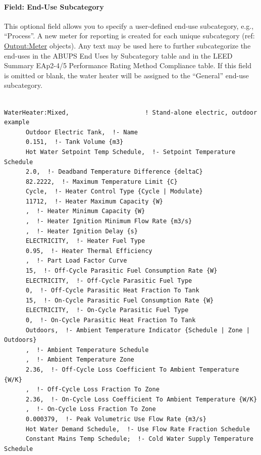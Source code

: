 \paragraph{Field: End-Use Subcategory}

This optional field allows you to specify a user-defined end-use subcategory, e.g., ``Process''. A new meter for reporting is created for each unique subcategory (ref: \hyperref[outputmeter-and-outputmetermeterfileonly]{Output:Meter} objects). Any text may be used here to further subcategorize the end-uses in the ABUPS End Uses by Subcategory table and in the LEED Summary EAp2-4/5 Performance Rating Method Compliance table. If this field is omitted or blank, the water heater will be assigned to the ``General'' end-use subcategory.


\begin{lstlisting}

WaterHeater:Mixed,                     ! Stand-alone electric, outdoor example
      Outdoor Electric Tank,  !- Name
      0.151,  !- Tank Volume {m3}
      Hot Water Setpoint Temp Schedule,  !- Setpoint Temperature Schedule
      2.0,  !- Deadband Temperature Difference {deltaC}
      82.2222,  !- Maximum Temperature Limit {C}
      Cycle,  !- Heater Control Type {Cycle | Modulate}
      11712,  !- Heater Maximum Capacity {W}
      ,  !- Heater Minimum Capacity {W}
      ,  !- Heater Ignition Minimum Flow Rate {m3/s}
      ,  !- Heater Ignition Delay {s}
      ELECTRICITY,  !- Heater Fuel Type
      0.95,  !- Heater Thermal Efficiency
      ,  !- Part Load Factor Curve
      15,  !- Off-Cycle Parasitic Fuel Consumption Rate {W}
      ELECTRICITY,  !- Off-Cycle Parasitic Fuel Type
      0,  !- Off-Cycle Parasitic Heat Fraction To Tank
      15,  !- On-Cycle Parasitic Fuel Consumption Rate {W}
      ELECTRICITY,  !- On-Cycle Parasitic Fuel Type
      0,  !- On-Cycle Parasitic Heat Fraction To Tank
      Outdoors,  !- Ambient Temperature Indicator {Schedule | Zone | Outdoors}
      ,  !- Ambient Temperature Schedule
      ,  !- Ambient Temperature Zone
      2.36,  !- Off-Cycle Loss Coefficient To Ambient Temperature {W/K}
      ,  !- Off-Cycle Loss Fraction To Zone
      2.36,  !- On-Cycle Loss Coefficient To Ambient Temperature {W/K}
      ,  !- On-Cycle Loss Fraction To Zone
      0.000379,  !- Peak Volumetric Use Flow Rate {m3/s}
      Hot Water Demand Schedule,  !- Use Flow Rate Fraction Schedule
      Constant Mains Temp Schedule;  !- Cold Water Supply Temperature Schedule





\end{lstlisting}
